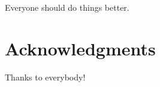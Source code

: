 \documentclass[aps,pre,twocolumn,nofootinbib,superscriptaddress,linenumbers]{revtex4-1}
\begin{document}
Everyone should do things better.


\section{Acknowledgments}
\label{section:acknowledgments}

Thanks to everybody!


 

\end{document}
